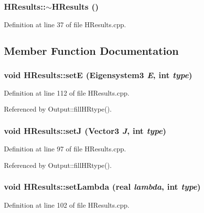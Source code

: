\subsubsection[{$\sim$HResults}]{\setlength{\rightskip}{0pt plus 5cm}HResults::$\sim$HResults ()}\label{classHResults_a6b47e902f388186c8f41bcf8e71b8252}


Definition at line 37 of file HResults.cpp.



\subsection{Member Function Documentation}
\subsubsection[{setE}]{\setlength{\rightskip}{0pt plus 5cm}void HResults::setE ({\bf Eigensystem3} {\em E}, \/  int {\em type})}\label{classHResults_afd0c60a0b27e380ae766a3755461e769}


Definition at line 112 of file HResults.cpp.



Referenced by Output::fillHRtype().

\subsubsection[{setJ}]{\setlength{\rightskip}{0pt plus 5cm}void HResults::setJ ({\bf Vector3} {\em J}, \/  int {\em type})}\label{classHResults_a0c6431cb687fd3f06c2d0d7792d76e5c}


Definition at line 97 of file HResults.cpp.



Referenced by Output::fillHRtype().

\subsubsection[{setLambda}]{\setlength{\rightskip}{0pt plus 5cm}void HResults::setLambda ({\bf real} {\em lambda}, \/  int {\em type})}\label{classHResults_a7f5dec2fe246d2e35a315edc8c4d2349}


Definition at line 102 of file HResults.cpp.



